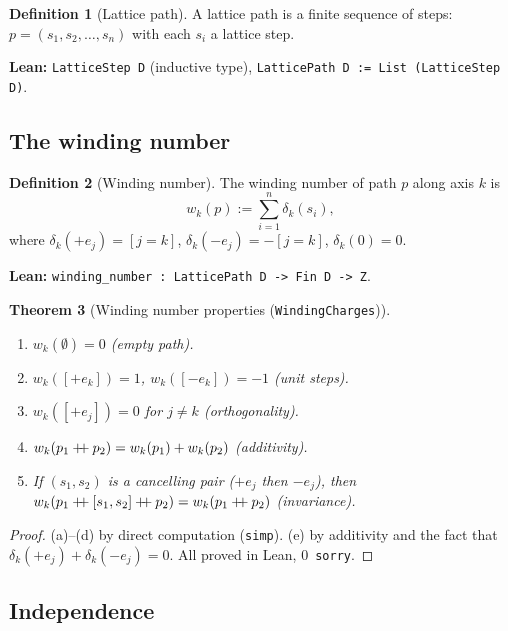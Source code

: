 \documentclass[11pt,a4paper]{article}
\theoremstyle{plain}
\newtheorem{theorem}{Theorem}[section]
\theoremstyle{definition}
\newtheorem{definition}[theorem]{Definition}
\theoremstyle{remark}
\begin{document}
\begin{definition}[Lattice path]
A lattice path is a finite sequence of steps:
$p = (s_1, s_2, \ldots, s_n)$ with each $s_i$ a lattice step.
\end{definition}

\noindent\textbf{Lean:} \texttt{LatticeStep D} (inductive type),
\texttt{LatticePath D := List (LatticeStep D)}.

\subsection{The winding number}

\begin{definition}[Winding number]
\label{def:winding}
The winding number of path $p$ along axis $k$ is
\[
  w_k(p) := \sum_{i=1}^n \delta_k(s_i),
\]
where $\delta_k(+e_j) = [j = k]$, $\delta_k(-e_j) = -[j = k]$,
$\delta_k(0) = 0$.
\end{definition}

\noindent\textbf{Lean:} \texttt{winding\_number : LatticePath D -> Fin D -> Z}.

\begin{theorem}[Winding number properties {\normalfont(\texttt{WindingCharges})}]
\label{thm:winding-props}
\begin{enumerate}[nosep,label=(\alph*)]
\item $w_k(\emptyset) = 0$ \;(empty path).
\item $w_k([+e_k]) = 1$, \;$w_k([-e_k]) = -1$ \;(unit steps).
\item $w_k([+e_j]) = 0$ for $j \neq k$ \;(orthogonality).
\item $w_k(p_1 \mathbin{+\mkern-6mu+} p_2) = w_k(p_1) + w_k(p_2)$ \;(additivity).
\item If $(s_1, s_2)$ is a cancelling pair ($+e_j$ then $-e_j$), then
  $w_k(p_1 \mathbin{+\mkern-6mu+} [s_1, s_2] \mathbin{+\mkern-6mu+} p_2) = w_k(p_1 \mathbin{+\mkern-6mu+} p_2)$ \;(invariance).
\end{enumerate}
\end{theorem}

\begin{proof}
(a)--(d) by direct computation (\texttt{simp}).
(e) by additivity and the fact that
$\delta_k(+e_j) + \delta_k(-e_j) = 0$.
All proved in Lean, 0~\texttt{sorry}.
\end{proof}

\subsection{Independence}
\end{document}
